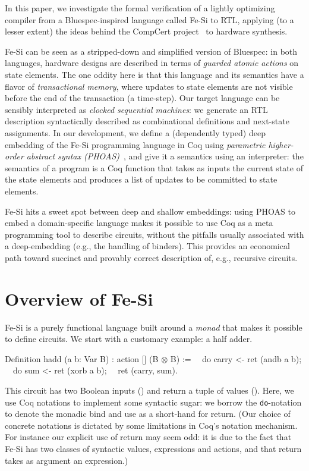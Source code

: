 \documentclass{llncs}
\newcommand{\project}{Fe-Si}
\begin{document}
\medskip In this paper, we investigate the formal verification of a
lightly optimizing compiler from a Bluespec-inspired language called
\project{} to RTL, applying (to a lesser extent) the ideas behind the
CompCert project~\cite{Leroy-backend} to hardware synthesis.

\medskip

\project{} can be seen as a stripped-down and simplified version
of Bluespec: in both languages, hardware designs are described in
terms of \emph{guarded atomic actions} on state elements. 
%
The one oddity here is that this language and its semantics have a
flavor of \emph{transactional memory}, where updates to state
elements are not visible before the end of the transaction (a
time-step).
%
Our target language can be sensibly interpreted as \emph{clocked
  sequential machines}: we generate an RTL description syntactically
described as combinational definitions and next-state assignments.
%
In our development, we define a (dependently typed) deep embedding of
the \project{} programming language in Coq using \emph{parametric
  higher-order abstract syntax (PHOAS)}~\cite{phoas-chlipala}, and
give it a semantics using an interpreter: the semantics of a program
is a Coq function that takes as inputs the current state of the
state elements and produces a list of updates to be committed to
state elements.

\project{} hits a sweet spot between deep and shallow embeddings: using
PHOAS to embed a domain-specific language makes it possible to use Coq
as a meta programming tool to describe circuits, without the pitfalls
usually associated with a deep-embedding (e.g., the handling of
binders).
%
This provides an economical path toward succinct and provably correct
description of, e.g., recursive circuits.

\section{Overview of Fe-Si}
Fe-Si is a purely functional language built around a \emph{monad} that
makes it possible to define circuits. We start with a customary
example: a half adder.
\begin{mcoq}
Definition hadd (a b: Var B) : action [] (B $\otimes$ B) :=
$\quad$do carry <- ret (andb a b); 
$\quad$do sum    <- ret (xorb a b);
$\quad$ret (carry, sum).  
\end{mcoq}
This circuit has two Boolean inputs () and return a tuple of
values (). 
%
Here, we use Coq notations to implement some syntactic sugar: we
borrow the \texttt{do}-notation to denote the monadic bind and use
 as a short-hand for return. 
% 
(Our choice of concrete notations is dictated by some limitations in
Coq's notation mechanism. For instance our explicit use of return may
seem odd: it is due to the fact that Fe-Si has two classes of
syntactic values, expressions and actions, and that return takes as
argument an expression.)
\end{document}

